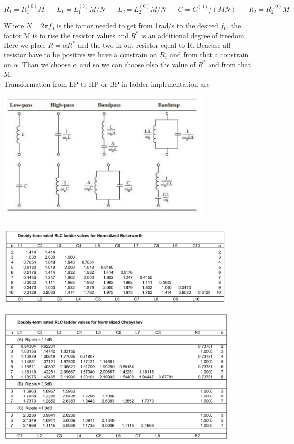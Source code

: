 \begin{equation}
R_1=R_1^{(0)}M \ \ \ \ \ \ \ \ L_1=L_1^{(0)}M/N \ \ \ \ \ \ \ \ L_2=L_2^{(0)}M/N \ \ \ \ \ \ \ \ C=C^{(0)}/(MN) \ \ \ \ \ \ \ \ R_2=R_2^{(0)}M
\end{equation}

Where $N=2\pi f_0$ is the factor needed to get from 1rad/s to the desired $f_0$, the factor M is to rise the resistor values and $R^*$ is an additional degree of freedom.\\
Here we place $R=\alpha R^*$ and the two in-out resistor equal to R. Beacuse all resistor have to be positive we have a constrain on $R_x$ and from that a constrain on $\alpha$. Than we choose $\alpha $ and so we can choose olso the value of $R^*$ and from that M.\\
\vspace{5mm}
Transformation from LP to HP or BP in ladder implementation are 

\centering
\includegraphics[width=0.8\textwidth]{ld.png}\\
\raggedright


\centering
\includegraphics[width=0.9\textwidth]{ldb.png}\\
\raggedright


\centering
\includegraphics[width=0.9\textwidth]{ldc.png}\\
\raggedright

